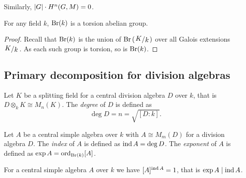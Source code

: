 \begin{opomba}
Similarly, $\left\lvert G\right\rvert \cdot H^n(G, M) = 0$.
\end{opomba}

\begin{posledica}
For any field $k$, $\operatorname{Br}(k)$ is a torsion abelian group.
\end{posledica}

\begin{proof}
Recall that $\operatorname{Br}(k)$ is the union of $\Br \br{\kvoc{K}{k}}$ over
all Galois extensions $\kvoc{K}{k}$. As each such group is torsion,
so is $\operatorname{Br}(k)$.
\end{proof}

\newpage

\subsection{Primary decomposition for division algebras}

\begin{definicija}
Let $K$ be a splitting field for a central division algebra $D$
over $k$, that is $D \otimes_k K \cong M_n(K)$. The
\emph{degree} of $D$ is defined as
\[
\deg D = n = \sqrt{[D : k]}.
\]
\end{definicija}

\begin{definicija}
Let $A$ be a central simple algebra over $k$ with $A \cong M_m(D)$
for a division algebra $D$. The \emph{index} of $A$
is defined as $\operatorname{ind} A = \deg D$. The
\emph{exponent} of $A$ is defined as
$\exp A = \operatorname{ord}_{\operatorname{Br}(k)} [A]$.
\end{definicija}

\begin{trditev}
For a central simple algebra $A$ over $k$ we have
$[A]^{\operatorname{ind} A} = 1$, that is $\exp A \mid \operatorname{ind} A$.
\end{trditev}

